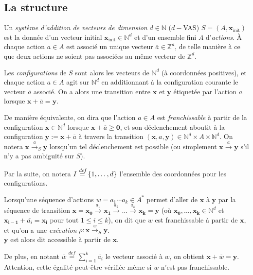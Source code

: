 \documentclass[a4paper,final]{article}
\theoremstyle{definition}
\let\leq\leqslant
\let\geq\geqslant
\newcommand{\os}[1]{\left\{\mathinner{#1}\right\}}
\newcommand{\defeq}{\ensuremath{\stackrel{\textit{def}}{=}}}
\newcommand{\N}{\ensuremath{\mathbb{N}}}
\newcommand{\Z}{\ensuremath{\mathbb{Z}}}
\newcommand{\trans}[2]{\ensuremath{\stackrel{#1}{\longrightarrow}_{#2}}}
\newcommand{\vect}[1]{\ensuremath{\mathbf{#1}}}
\newcommand{\xinit}{\ensuremath{\vect{x}_\text{init}}}
\newcommand{\valeur}[1]{\ensuremath{\overline{#1}}}
\begin{document}
\subsection{La structure}

Un \emph{système d'addition de vecteurs de dimension} $d\in\N$ ($d-$VAS) $S=(A,\xinit)$ est la donnée d'un vecteur initial $\xinit\in\N^d$ et d'un ensemble fini $A$ d'\emph{actions}.
À chaque action $a\in A$ est associé un unique vecteur $\valeur{a}\in \Z^d$, de telle manière à ce que deux actions ne soient pas associées au même vecteur de $\Z^d$.
\vspace{3mm}

Les \emph{configurations} de $S$ sont alors les vecteurs de $\N^d$ (à coordonnées positives), 
et chaque action $a\in A$ agit sur $\N^d$ en additionnant à la configuration courante le vecteur $\valeur{a}$ associé.
On a alors une transition entre $\vect{x}$ et $\vect{y}$ étiquetée par l'action $a$ lorsque $\vect{x} + \valeur{a} = \vect{y}$.

De manière équivalente, on dira que l'action $a\in A$ est \emph{franchissable} 
à partir de la configuration $\vect{x}\in \N^d$ lorsque $\vect{x} + \valeur{a} \geq \vect{0}$,
et son déclenchement aboutit à la configuration $\vect{y} := \vect{x} + \valeur{a}$ à travers la transition $(\vect{x},a,\vect{y})\in \N^d\times A\times \N^d$.
On notera $\vect{x}\trans{a}{S} \vect{y}$ lorsqu'un tel déclenchement est possible (ou simplement $\vect{x}\trans{a}{} \vect{y}$ s'il n'y a pas ambiguité sur $S$).

\begin{center}
Par la suite, on notera $I \defeq \os{1,\dots,d}$ l'ensemble des coordonnées pour les configurations.
\end{center}

Lorsqu'une séquence d'actions $w= a_1\cdots a_k\in A^\ast$ permet d'aller de $\vect{x}$ à $\vect{y}$ par la séquence de transition $\vect{x}= \vect{x_0}\trans{a_1}{} \vect{x_1}\trans{a_2}{} \dots\trans{a_k}{} \vect{x_k}=\vect{y}$
(où $\vect{x_0},\dots,\vect{x_k} \in\N^d$ et $\vect{x_{i-1}} +\valeur{a_i} =\vect{x_i}$ pour tout $1\leq i\leq k$),
on dit que $w$ est franchissable à partir de $\vect{x}$, et qu'on a une \emph{exécution} $\rho :\vect{x}\trans{w}{S} \vect{y}$.\\
$\vect{y}$ est alors dit accessible à partir de $\vect{x}$.

De plus, en notant $\valeur{w}\defeq \sum^k_{i=1} \valeur{a_i}$ le vecteur associé à $w$, on obtient $\vect{x} +\valeur{w} = \vect{y}$.
Attention, cette égalité peut-être vérifiée même si $w$ n'est pas franchissable.
\vspace{3mm}
\end{document}
